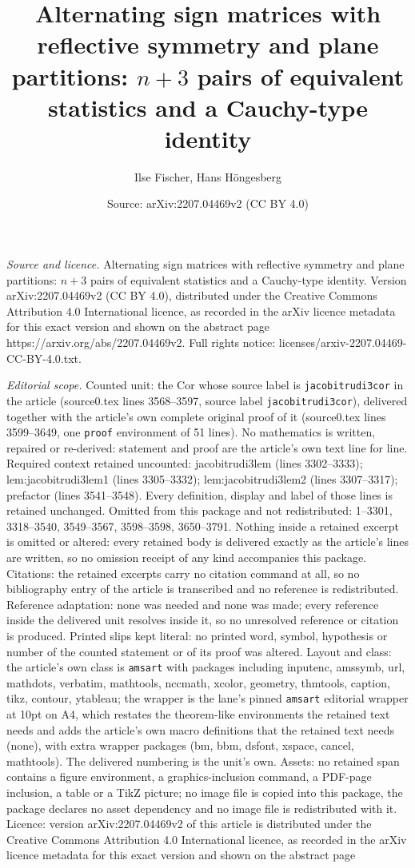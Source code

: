 \documentclass[10pt,a4paper]{amsart}
\title[Alternating sign matrices with reflective symmetry and plane]{Alternating sign matrices with reflective symmetry and plane partitions: $n+3$ pairs of equivalent statistics and a Cauchy-type identity}
\author{Ilse Fischer, Hans H\"ongesberg}
\date{Source: arXiv:2207.04469v2 (CC BY 4.0)}
\begin{document}
\maketitle

\noindent\emph{Source and licence.} Alternating sign matrices with reflective symmetry and plane partitions: $n+3$ pairs of equivalent statistics and a Cauchy-type identity. Version arXiv:2207.04469v2 (CC BY 4.0), distributed under the Creative Commons Attribution 4.0 International licence, as recorded in the arXiv licence metadata for this exact version and shown on the abstract page https://arxiv.org/abs/2207.04469v2. Full rights notice: licenses/arxiv-2207.04469-CC-BY-4.0.txt.\par\smallskip

\noindent\textit{Editorial scope.} Counted unit: the Cor whose source label is \texttt{jacobitrudi3cor} in the article (source0.tex lines 3568--3597, source label \texttt{jacobitrudi3cor}), delivered together with the article's own complete original proof of it (source0.tex lines 3599--3649, one \texttt{proof} environment of 51 lines). No mathematics is written, repaired or re-derived: statement and proof are the article's own text line for line. Required context retained uncounted: jacobitrudi3lem (lines 3302--3333); lem:jacobitrudi3lem1 (lines 3305--3332); lem:jacobitrudi3lem2 (lines 3307--3317); prefactor (lines 3541--3548). Every definition, display and label of those lines is retained unchanged. Omitted from this package and not redistributed: 1--3301, 3318--3540, 3549--3567, 3598--3598, 3650--3791. Nothing inside a retained excerpt is omitted or altered: every retained body is delivered exactly as the article's lines are written, so no omission receipt of any kind accompanies this package. Citations: the retained excerpts carry no citation command at all, so no bibliography entry of the article is transcribed and no reference is redistributed. Reference adaptation: none was needed and none was made; every reference inside the delivered unit resolves inside it, so no unresolved reference or citation is produced. Printed slips kept literal: no printed word, symbol, hypothesis or number of the counted statement or of its proof was altered. Layout and class: the article's own class is \texttt{amsart} with packages including inputenc, amssymb, url, mathdots, verbatim, mathtools, nccmath, xcolor, geometry, thmtools, caption, tikz, contour, ytableau; the wrapper is the lane's pinned \texttt{amsart} editorial wrapper at 10pt on A4, which restates the theorem-like environments the retained text needs and adds the article's own macro definitions that the retained text needs (none), with extra wrapper packages (bm, bbm, dsfont, xspace, cancel, mathtools). The delivered numbering is the unit's own. Assets: no retained span contains a figure environment, a graphics-inclusion command, a PDF-page inclusion, a table or a TikZ picture; no image file is copied into this package, the package declares no asset dependency and no image file is redistributed with it. Licence: version arXiv:2207.04469v2 of this article is distributed under the Creative Commons Attribution 4.0 International licence, as recorded in the arXiv licence metadata for this exact version and shown on the abstract page 
\end{document}
